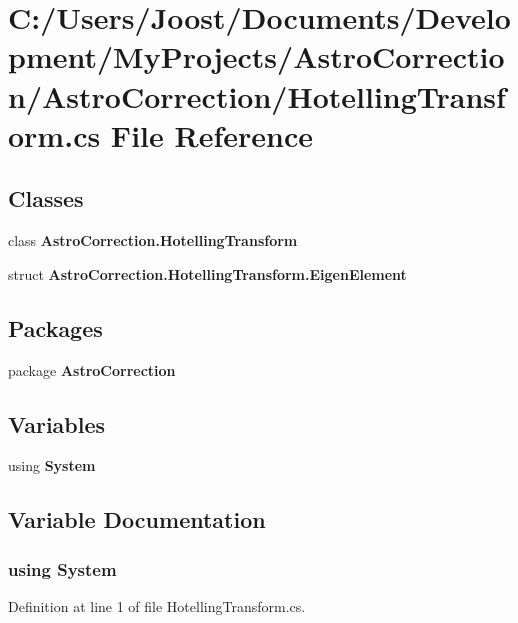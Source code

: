 \section{C:/Users/Joost/Documents/Development/MyProjects/AstroCorrection/AstroCorrection/HotellingTransform.cs File Reference}
\label{_hotelling_transform_8cs}
\subsection*{Classes}
\begin{DoxyCompactItemize}
\item 
class {\bf AstroCorrection.HotellingTransform}
\item 
struct {\bfseries AstroCorrection.HotellingTransform.EigenElement}
\end{DoxyCompactItemize}
\subsection*{Packages}
\begin{DoxyCompactItemize}
\item 
package {\bf AstroCorrection}
\end{DoxyCompactItemize}
\subsection*{Variables}
\begin{DoxyCompactItemize}
\item 
﻿using {\bf System}
\end{DoxyCompactItemize}


\subsection{Variable Documentation}
\subsubsection[{System}]{\setlength{\rightskip}{0pt plus 5cm}﻿using {\bf System}}\label{_hotelling_transform_8cs_a81a223a02c34d82b47199f08308847f2}


Definition at line 1 of file HotellingTransform.cs.